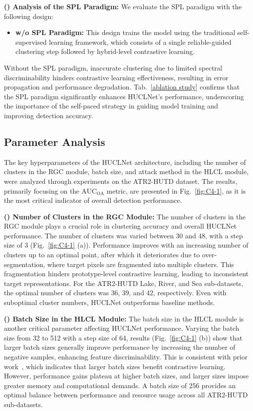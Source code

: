 \par
\textbf{() Analysis of the SPL Paradigm:} We evaluate the SPL paradigm with the following design: 
\begin{itemize}
    \item \textbf{w/o SPL Paradigm:} This design trains the model using the traditional self-supervised learning framework, which consists of a single reliable-guided clustering step followed by hybrid-level contrastive learning.
\end{itemize}
\par
Without the SPL paradigm, inaccurate clustering due to limited spectral discriminability hinders contrastive learning effectiveness, resulting in error propagation and performance degradation. Tab.~\ref{ablation study} confirms that the SPL paradigm significantly enhances HUCLNet's performance, underscoring the importance of the self-paced strategy in guiding model training and improving detection accuracy.
\par
\subsection{Parameter Analysis}\label{sec:4.5}
The key hyperparameters of the HUCLNet architecture, including the number of clusters in the RGC module, batch size, and attack method in the HLCL module, were analyzed through experiments on the ATR2-HUTD dataset. The results, primarily focusing on the $\text{AUC}_{\text{OA}}$ metric, are presented in Fig.~\ref{fig:C4-1}, as it is the most critical indicator of overall detection performance.
\par
\textbf{() Number of Clusters in the RGC Module:} The number of clusters in the RGC module plays a crucial role in clustering accuracy and overall HUCLNet performance. The number of clusters was varied between 30 and 48, with a step size of 3 (Fig.~\ref{fig:C4-1} (a)). Performance improves with an increasing number of clusters up to an optimal point, after which it deteriorates due to over-segmentation, where target pixels are fragmented into multiple clusters. This fragmentation hinders prototype-level contrastive learning, leading to inconsistent target representations. For the ATR2-HUTD Lake, River, and Sea sub-datasets, the optimal number of clusters was 36, 39, and 42, respectively. Even with suboptimal cluster numbers, HUCLNet outperforms baseline methods.

\textbf{() Batch Size in the HLCL Module:} The batch size in the HLCL module is another critical parameter affecting HUCLNet performance. Varying the batch size from 32 to 512 with a step size of 64, results (Fig.~\ref{fig:C4-1} (b)) show that larger batch sizes generally improve performance by increasing the number of negative samples, enhancing feature discriminability. This is consistent with prior work~\cite{Chen2020}, which indicates that larger batch sizes benefit contrastive learning. However, performance gains plateau at higher batch sizes, and larger sizes impose greater memory and computational demands. A batch size of 256 provides an optimal balance between performance and resource usage across all ATR2-HUTD sub-datasets.

